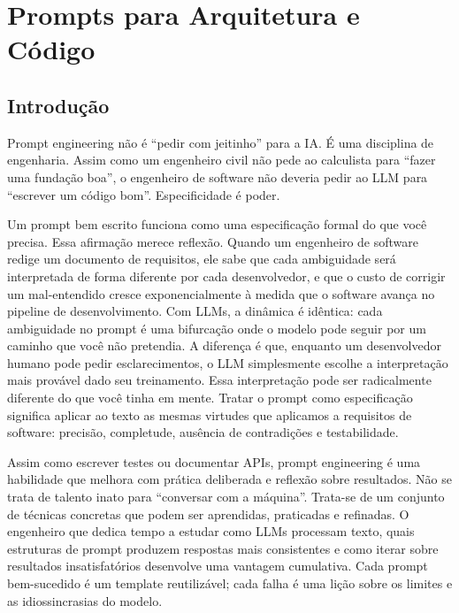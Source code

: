 \chapter{Prompts para Arquitetura e Código}

\section{Introdução}

Prompt engineering não é ``pedir com jeitinho'' para a IA. É uma disciplina de
engenharia. Assim como um engenheiro civil não pede ao calculista para
``fazer uma fundação boa'', o engenheiro de software não deveria pedir ao LLM
para ``escrever um código bom''. Especificidade é poder.

Um prompt bem escrito funciona como uma especificação formal do que você
precisa. Essa afirmação merece reflexão. Quando um engenheiro de software redige
um documento de requisitos, ele sabe que cada ambiguidade será interpretada de
forma diferente por cada desenvolvedor, e que o custo de corrigir um
mal-entendido cresce exponencialmente à medida que o software avança no pipeline
de desenvolvimento. Com LLMs, a dinâmica é idêntica: cada ambiguidade no prompt
é uma bifurcação onde o modelo pode seguir por um caminho que você não pretendia.
A diferença é que, enquanto um desenvolvedor humano pode pedir esclarecimentos,
o LLM simplesmente escolhe a interpretação mais provável dado seu treinamento.
Essa interpretação pode ser radicalmente diferente do que você tinha em
mente. Tratar o prompt como especificação significa aplicar ao texto as mesmas
virtudes que aplicamos a requisitos de software: precisão, completude,
ausência de contradições e testabilidade.

Assim como escrever testes ou documentar APIs, prompt engineering é uma
habilidade que melhora com prática deliberada e reflexão sobre resultados. Não se
trata de talento inato para ``conversar com a máquina''. Trata-se de um
conjunto de técnicas concretas que podem ser aprendidas, praticadas e refinadas.
O engenheiro que dedica tempo a estudar como LLMs processam texto, quais
estruturas de prompt produzem respostas mais consistentes e como iterar sobre
resultados insatisfatórios desenvolve uma vantagem cumulativa. Cada prompt
bem-sucedido é um template reutilizável; cada falha é uma lição sobre os limites
e as idiossincrasias do modelo.

